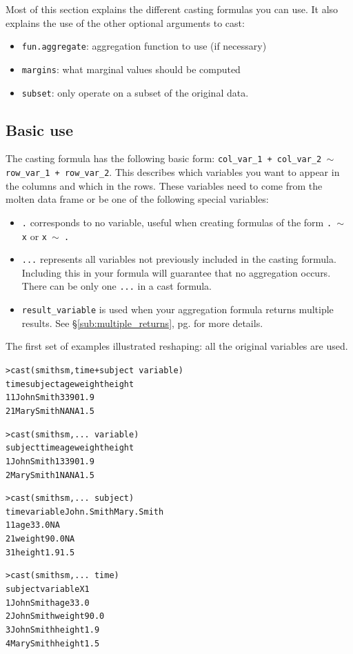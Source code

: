 \documentclass[oneside,letterpaper]{scrartcl}
\newcommand{\secref}[1]{\S \ref{#1}, pg. \pageref{#1}}
\begin{document}
Most of this section explains the different casting formulas you can use.  It also explains the use of the other optional arguments to cast:

\begin{itemize}
	\item {\tt fun.aggregate}: aggregation function to use (if necessary)
	\item {\tt margins}: what marginal values should be computed
	\item {\tt subset}: only operate on a subset of the original data.
\end{itemize}

\subsection{Basic use}\label{sub:basic_use}

The casting formula has the following basic form: {\tt col\_var\_1 +  col\_var\_2 $\sim$ row\_var\_1 + row\_var\_2}.  This describes which variables you want to appear in the columns and which in the rows.  These variables need to come from the molten data frame or be one of the following special variables:

\begin{itemize}
	\item {\tt .} corresponds to no variable, useful when creating formulas of the form {\tt .\ $\sim$ x} or {\tt x $\sim$ .}
	\item {\tt ...} represents all variables not previously included in the casting formula.  Including this in your formula will guarantee that no aggregation occurs.  There can be only one {\tt ...} in a cast formula.
	\item {\tt result\_variable} is used when your aggregation formula returns multiple results.  See \secref{sub:multiple_returns} for more details.
\end{itemize}

The first set of examples illustrated reshaping: all the original variables are used.

\begin{alltt}
> cast(smithsm, time + subject ~ variable)
  time    subject age weight height
1    1 John Smith  33     90    1.9
2    1 Mary Smith  NA     NA    1.5

> cast(smithsm, ... ~ variable)
     subject time age weight height
1 John Smith    1  33     90    1.9
2 Mary Smith    1  NA     NA    1.5

> cast(smithsm, ... ~ subject)
  time variable John.Smith Mary.Smith
1    1      age       33.0         NA
2    1   weight       90.0         NA
3    1   height        1.9        1.5

> cast(smithsm, ... ~ time)
     subject variable   X1
1 John Smith      age 33.0
2 John Smith   weight 90.0
3 John Smith   height  1.9
4 Mary Smith   height  1.5

\end{alltt}
\end{document}
